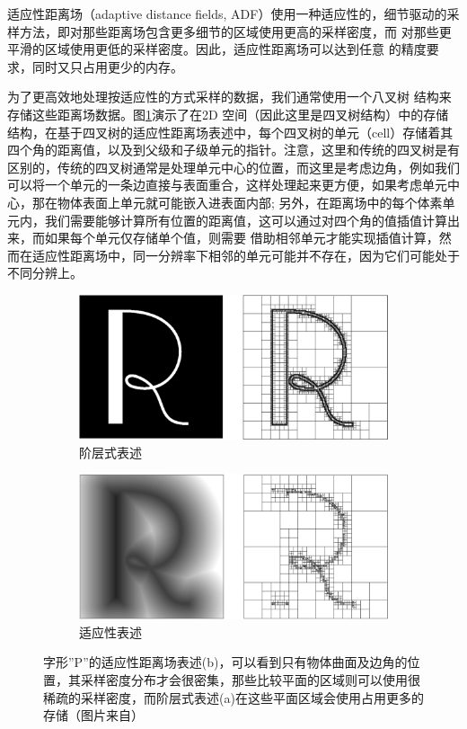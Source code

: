 适应性距离场（adaptive distance fields, ADF）使用一种适应性的，细节驱动的采样方法，即对那些距离场包含更多细节的区域使用更高的采样密度，而 对那些更平滑的区域使用更低的采样密度。因此，适应性距离场可以达到任意 的精度要求，同时又只占用更少的内存。

为了更高效地处理按适应性的方式采样的数据，我们通常使用一个八叉树 结构来存储这些距离场数据。图\ref{f:df-adf}演示了在2D 空间（因此这里是四叉树结构）中的存储结构，在基于四叉树的适应性距离场表述中，每个四叉树的单元（cell）存储着其四个角的距离值，以及到父级和子级单元的指针。注意，这里和传统的四叉树是有区别的，传统的四叉树通常是处理单元中心的位置，而这里是考虑边角，例如我们可以将一个单元的一条边直接与表面重合，这样处理起来更方便，如果考虑单元中心，那在物体表面上单元就可能嵌入进表面内部; 另外，在距离场中的每个体素单元内，我们需要能够计算所有位置的距离值，这可以通过对四个角的值插值计算出来，而如果每个单元仅存储单个值，则需要 借助相邻单元才能实现插值计算，然而在适应性距离场中，同一分辨率下相邻的单元可能并不存在，因为它们可能处于不同分辨上。

\begin{figure}
\begin{fullwidth}
	\begin{subfigure}[b]{0.5\thewidth}
		\includegraphics[width=\textwidth]{figures/df/adf-1}
		\caption{阶层式表述}
	\end{subfigure}
	\begin{subfigure}[b]{0.5\thewidth}
		\includegraphics[width=\textwidth]{figures/df/adf-2}
		\caption{适应性表述}
	\end{subfigure}
	\caption{字形”P”的适应性距离场表述(b)，可以看到只有物体曲面及边角的位置，其采样密度分布才会很密集，那些比较平面的区域则可以使用很稀疏的采样密度，而阶层式表述(a)在这些平面区域会使用占用更多的存储（图片来自\cite{a:adf}）}
	\label{f:df-adf}
\end{fullwidth}
\end{figure}

